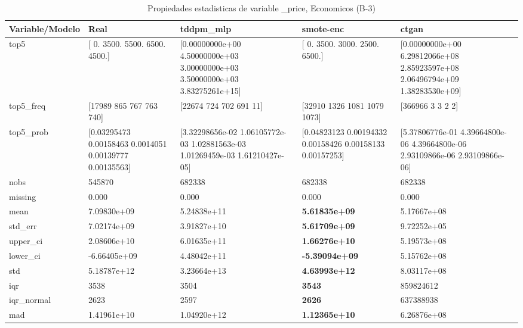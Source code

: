 \begin{table}[H]
\centering
\fontsize{8}{14}\selectfont
\caption{Propiedades  estadisticas de variable \_price, Economicos (B-3)}
\label{table-stats-economicos-b-3-_price}
\begin{tabular}{|l|m{10em}|m{10em}|m{10em}|m{10em}|}
\hline
 \rowcolor[gray]{0.8}
Variable/Modelo & Real & tddpm\_mlp & smote-enc & ctgan \\
\hline top5 & [   0. 3500. 5500. 6500. 4500.] & [0.00000000e+00 4.50000000e+03 3.00000000e+03 3.50000000e+03
 3.83275261e+15] & [   0. 3500. 3000. 2500. 6500.] & [0.00000000e+00 6.29812066e+08 2.85923597e+08 2.06496794e+09
 1.38283530e+09] \\
\hline top5\_freq & [17989   865   767   763   740] & [22674   724   702   691    11] & [32910  1326  1081  1079  1073] & [366966      3      3      2      2] \\
\hline top5\_prob & [0.03295473 0.00158463 0.0014051  0.00139777 0.00135563] & [3.32298656e-02 1.06105772e-03 1.02881563e-03 1.01269459e-03
 1.61210427e-05] & [0.04823123 0.00194332 0.00158426 0.00158133 0.00157253] & [5.37806776e-01 4.39664800e-06 4.39664800e-06 2.93109866e-06
 2.93109866e-06] \\
\hline nobs & 545870 & 682338 & 682338 & 682338 \\
\hline missing & 0.000 & 0.000 & 0.000 & 0.000 \\
\hline mean & 7.09830e+09 & \cellcolor[rgb]{0.9, 0.54, 0.52} 5.24838e+11 & \bfseries 5.61835e+09 & 5.17667e+08 \\
\hline std\_err & 7.02174e+09 & \cellcolor[rgb]{0.9, 0.54, 0.52} 3.91827e+10 & \bfseries 5.61709e+09 & 9.72252e+05 \\
\hline upper\_ci & 2.08606e+10 & \cellcolor[rgb]{0.9, 0.54, 0.52} 6.01635e+11 & \bfseries 1.66276e+10 & 5.19573e+08 \\
\hline lower\_ci & -6.66405e+09 & \cellcolor[rgb]{0.9, 0.54, 0.52} 4.48042e+11 & \bfseries -5.39094e+09 & 5.15762e+08 \\
\hline std & 5.18787e+12 & \cellcolor[rgb]{0.9, 0.54, 0.52} 3.23664e+13 & \bfseries 4.63993e+12 & 8.03117e+08 \\
\hline iqr & 3538 & 3504 & \bfseries 3543 & \cellcolor[rgb]{0.9, 0.54, 0.52} 859824612 \\
\hline iqr\_normal & 2623 & 2597 & \bfseries 2626 & \cellcolor[rgb]{0.9, 0.54, 0.52} 637388938 \\
\hline mad & 1.41961e+10 & \cellcolor[rgb]{0.9, 0.54, 0.52} 1.04920e+12 & \bfseries 1.12365e+10 & 6.26876e+08 \\

\end{tabular}
\end{table}
